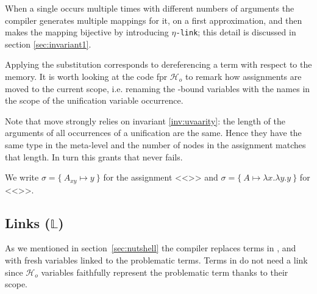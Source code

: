 \documentclass[sigconf,natbib=false,review]{acmart}
\newcommand{\linkMacro}[1]{\ensuremath{#1}\texttt{-link}\xspace}
\newcommand{\linketa} {\linkMacro{\eta}}
\newcommand{\Fo}{\ensuremath{\mathcal{F}_{\!o}\xspace}} %
\newcommand{\Ho}{\ensuremath{\mathcal{H}_o}\xspace}
\newcommand{\linkStore}{\ensuremath{\mathbb{L}}\xspace}
\begin{document}


\noindent
When a single  occurs multiple times with different numbers
of arguments the compiler generates multiple mappings for it, on a first
approximation, and then makes the mapping bijective by introducing
\linketa; this detail is discussed in section \ref{sec:invariant1}.

Applying the substitution corresponds to dereferencing a term with respect to
the memory.
% 
It is worth looking at the code fpr \Ho{} to remark how assignments are moved
to the current scope, i.e. renaming the -bound variables
with the names in the scope of the unification variable occurrence.



\noindent
Note that move strongly relies on invariant \ref{inv:uvaarity}: the length
of the arguments of all occurrences of a unification are the same. Hence
they have the same type in the meta-level and the number of 
nodes in the assignment matches that length. In turn this grants that
 never fails.



We write $\sigma = \{~ A_{xy} \mapsto y ~\}$ for the assignment
<<>> and $\sigma = \{~ A \mapsto \lambda x.\lambda y.y ~\}$
for <<>>.

\subsection{Links (\linkStore)}

\noindent
As we mentioned in section~\ref{sec:nutshell} the compiler
replaces terms in \maybeeta, \maybebeta and \notllambda with fresh
variables linked to the problematic terms. Terms in \maybebeta do not
need a link since \Ho{} variables faithfully represent
the problematic term thanks to their scope.
\end{document}
